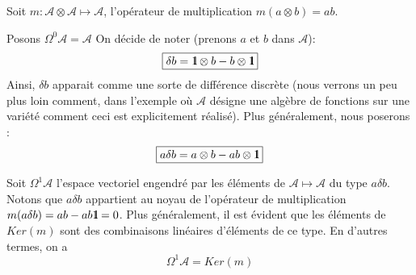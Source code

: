 	Soit $m : {\mathcal A} \otimes {\mathcal A} \mapsto {\mathcal A}$, 
	l'op\'erateur de multiplication $m (a\otimes b) = ab$.
	
	Posons $\Omega^0{\mathcal A}  =  {\mathcal A}$
	On d\'ecide de noter (prenons $a$ et $b$ dans ${\mathcal A}$):
	$$
	\mbox{\fbox{$
	\delta b  =  \mbox{\rm 1}\hskip-3pt \mbox{\rm l} \otimes b - b \otimes \mbox{\rm 1}\hskip-3pt \mbox{\rm l}
	$}}
	$$
	Ainsi, $\delta b$ apparait comme une sorte de diff\'erence discr\`ete 
	(nous verrons un peu plus loin comment, dans l'exemple  o\`u ${\mathcal A}$ d\'esigne une 
	alg\`ebre de fonctions sur une vari\'et\'e comment ceci est explicitement 
	r\'ealis\'e). Plus g\'en\'eralement, nous poserons :
	$$
	\mbox{\fbox{$
	a\delta b  =  a \otimes b - ab \otimes \mbox{\rm 1}\hskip-3pt \mbox{\rm l}
	$}}
	$$
	
	Soit $\Omega^{1}{\mathcal A}$ l'espace vectoriel engendr\'e par les 
	\'el\'ements de ${\mathcal A} \mapsto {\mathcal A}$ du type $a\delta b$.
	Notons que $a \delta b$ appartient au noyau de l'op\'erateur de 
	multiplication $m(a \delta b) = ab - ab \mbox{\rm 1}\hskip-3pt \mbox{\rm l} = 0$. Plus 
	g\'en\'eralement, il est \'evident que les \'el\'ements de $Ker(m)$ sont des 
	combinaisons lin\'eaires d'\'el\'ements de ce type. En d'autres termes, on a
	$$ \Omega^{1}{\mathcal A}  =  Ker(m)$$
	
